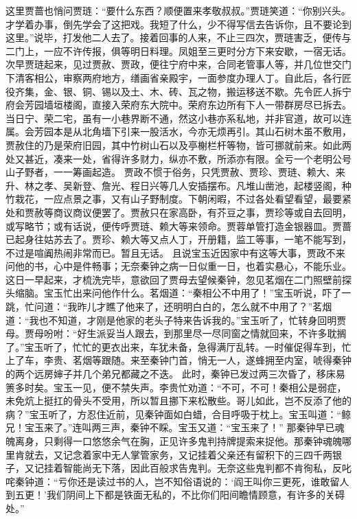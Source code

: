 \documentclass[12pt,oneside]{book}
\begin{document}
这里贾蔷也悄问贾琏：“要什么东西？顺便置来孝敬叔叔。”贾琏笑道：“你别兴头。才学着办事，倒先学会了这把戏。我短了什么，少不得写信去告诉你，且不要论到这里。”说毕，打发他二人去了。接着回事的人来，不止三四次，贾琏害乏，便传与二门上，一应不许传报，俱等明日料理。凤姐至三更时分方下来安歇，一宿无话。
次早贾琏起来，见过贾赦、贾政，便往宁府中来，合同老管事人等，并几位世交门下清客相公，审察两府地方，缮画省亲殿宇，一面参度办理人丁。自此后，各行匠役齐集，金、银、铜、锡以及土、木、砖、瓦之物，搬运移送不歇。先令匠人拆宁府会芳园墙垣楼阁，直接入荣府东大院中。荣府东边所有下人一带群房尽已拆去。当日宁、荣二宅，虽有一小巷界断不通，然这小巷亦系私地，并非官道，故可以连属。会芳园本是从北角墙下引来一股活水，今亦无烦再引。其山石树木虽不敷用，贾赦住的乃是荣府旧园，其中竹树山石以及亭榭栏杆等物，皆可挪就前来。如此两处又甚近，凑来一处，省得许多财力，纵亦不敷，所添亦有限。全亏一个老明公号山子野者，一一筹画起造。
贾政不惯于俗务，只凭贾赦、贾珍、贾琏、赖大、来升、林之孝、吴新登、詹光、程日兴等几人安插摆布。凡堆山凿池，起楼竖阁，种竹栽花，一应点景之事，又有山子野制度。下朝闲暇，不过各处看望看望，最要紧处和贾赦等商议商议便罢了。贾赦只在家高卧，有芥豆之事，贾珍等或自去回明，或写略节；或有话说，便传呼贾琏、赖大等来领命。贾蓉单管打造金银器皿。贾蔷已起身往姑苏去了。贾珍、赖大等又点人丁，开册籍，监工等事，一笔不能写到，不过是喧阗热闹非常而已。暂且无话。
且说宝玉近因家中有这等大事，贾政不来问他的书，心中是件畅事；无奈秦钟之病一日似重一日，也着实悬心，不能乐业。这日一早起来，才梳洗完毕，意欲回了贾母去望候秦钟，忽见茗烟在二门照壁前探头缩脑。宝玉忙出来问他作什么。茗烟道：“秦相公不中用了！”宝玉听说，吓了一跳，忙问道：“我昨儿才瞧了他来了，还明明白白的，怎么就不中用了？”茗烟道：“我也不知道，才刚是他家的老头子特来告诉我的。”宝玉听了，忙转身回明贾母。贾母吩咐：“好生派妥当人跟去，到那里尽一尽同窗之情就回来，不许多耽搁了。”宝玉听了，忙忙的更衣出来，车犹未备，急得满厅乱转。一时催促得车到，忙上了车，李贵、茗烟等跟随。来至秦钟门首，悄无一人，遂蜂拥至内室，唬得秦钟的两个远房婶子并几个弟兄都藏之不迭。
此时，秦钟已发过两三次昏了，移床易箦多时矣。宝玉一见，便不禁失声。李贵忙劝道：“不可，不可！秦相公是弱症，未免炕上挺扛的骨头不受用，所以暂且挪下来松散些。哥儿如此，岂不反添了他的病？”宝玉听了，方忍住近前，见秦钟面如白蜡，合目呼吸于枕上。宝玉叫道：“鲸兄！宝玉来了。”连叫两三声，秦钟不睬。宝玉又道：“宝玉来了！”
那秦钟早已魂魄离身，只剩得一口悠悠余气在胸，正见许多鬼判持牌提索来捉他。那秦钟魂魄哪里肯就去，又记念着家中无人掌管家务，又记挂着父亲还有留积下的三四千两银子，又记挂着智能尚无下落，因此百般求告鬼判。无奈这些鬼判都不肯徇私，反叱咤秦钟道：“亏你还是读过书的人，岂不知俗语说的：‘阎王叫你三更死，谁敢留人到五更！’我们阴间上下都是铁面无私的，不比你们阳间瞻情顾意，有许多的关碍处。”
\end{document}
